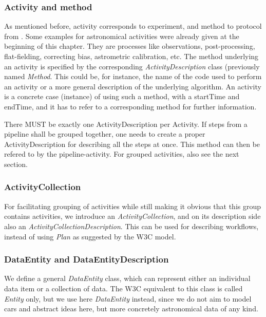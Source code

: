 \subsubsection{Activity and method}
As mentioned before, activity corresponds to experiment, and method to protocol from \cite{std:SimDM}.
Some examples for astronomical activities were already given at the beginning of this chapter. They are processes like observations, post-processing, flat-fielding, correcting bias, astrometric calibration, etc. The method underlying an activity is specified by the corresponding \emph{ActivityDescription} class (previously named \emph{Method}. This could be, for instance, the name of the code used to perform an activity or a more general description of the underlying algorithm. An activity is a concrete case (instance) of using such a method, with a startTime and endTime, and it has to refer to a corresponding method for further information. 

There MUST be exactly one ActivityDescription per Activity. If steps from a pipeline shall be 
grouped together, one needs to create a proper ActivityDescription for describing all 
the steps at once. This method can then be refered to by the pipeline-activity. For grouped activities, also see the next section.

\subsubsection{ActivityCollection}
For facilitating grouping of activities while still making it obvious that this group contains activities, we introduce an \emph{ActivityCollection}, and on its description side also an \emph{ActivityCollectionDescription}. This can be used for describing workflows, instead of using \emph{Plan} as suggested by the W3C model.


\subsubsection{DataEntity and DataEntityDescription}
We define a general \emph{DataEntity} class, 
which can represent either an individual data item or a collection of data. The W3C equivalent to this class is called \emph{Entity} only, but we use here \emph{DataEntity} instead, since we do not aim to model cars and abstract ideas here, but more concretely astronomical data of any kind.

